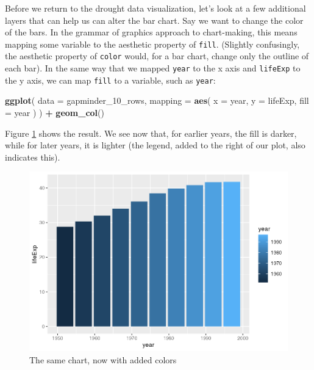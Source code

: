\documentclass[
]{book}
\newenvironment{Shaded}{\begin{snugshade}}{\end{snugshade}}
\newcommand{\AttributeTok}[1]{\textcolor[rgb]{0.13,0.29,0.53}{#1}}
\newcommand{\FunctionTok}[1]{\textcolor[rgb]{0.13,0.29,0.53}{\textbf{#1}}}
\newcommand{\NormalTok}[1]{#1}
\newcommand{\SpecialCharTok}[1]{\textcolor[rgb]{0.81,0.36,0.00}{\textbf{#1}}}
\begin{document}
Before we return to the drought data visualization, let's look at a few additional layers that can help us can alter the bar chart. Say we want to change the color of the bars. In the grammar of graphics approach to chart-making, this means mapping some variable to the aesthetic property of \texttt{fill}. (Slightly confusingly, the aesthetic property of \texttt{color} would, for a bar chart, change only the outline of each bar). In the same way that we mapped \texttt{year} to the x axis and \texttt{lifeExp} to the y axis, we can map \texttt{fill} to a variable, such as \texttt{year}:

\begin{Shaded}
\begin{Highlighting}[]
\FunctionTok{ggplot}\NormalTok{(}
  \AttributeTok{data =}\NormalTok{ gapminder\_10\_rows,}
  \AttributeTok{mapping =} \FunctionTok{aes}\NormalTok{(}
    \AttributeTok{x =}\NormalTok{ year,}
    \AttributeTok{y =}\NormalTok{ lifeExp,}
    \AttributeTok{fill =}\NormalTok{ year}
\NormalTok{  )}
\NormalTok{) }\SpecialCharTok{+}
  \FunctionTok{geom\_col}\NormalTok{()}
\end{Highlighting}
\end{Shaded}

Figure \ref{fig:gapminder-bar-colors-plot} shows the result. We see now that, for earlier years, the fill is darker, while for later years, it is lighter (the legend, added to the right of our plot, also indicates this).

\begin{figure}
\includegraphics[width=1\linewidth]{data-viz_files/figure-latex/gapminder-bar-colors-plot-1} \caption{The same chart, now with added colors}\label{fig:gapminder-bar-colors-plot}
\end{figure}
\end{document}
